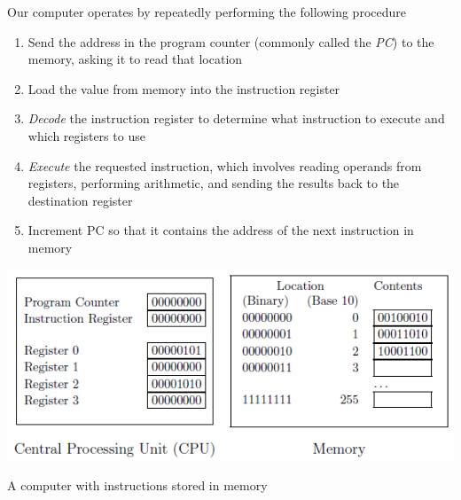 \documentclass[8pt,a4paper,compress]{beamer}
\begin{document}
\begin{frame}[fragile]
Our computer operates by repeatedly performing the following procedure
\begin{enumerate}
\item Send the address in the program counter (commonly called the \emph{PC}) to the memory, asking it to read that location

\item Load the value from memory into the instruction register

\item \emph{Decode} the instruction register to determine what instruction to execute and which registers to use

\item \emph{Execute} the requested instruction, which involves reading operands from registers, performing arithmetic, and sending the results back to the destination register

\item Increment PC so that it contains the address of the next instruction in memory
\end{enumerate}
\begin{center}
\includegraphics[scale=0.35]{figures/von_neumann_arch.png}

\smallskip

\tiny A computer with instructions stored in memory
\end{center}

\end{frame}
\end{document}
